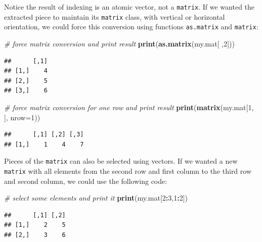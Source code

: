 \documentclass[11pt,]{book}
\newenvironment{Shaded}{\begin{snugshade}}{\end{snugshade}}
\newcommand{\KeywordTok}[1]{\textcolor[rgb]{0.27,0.27,0.27}{\textbf{#1}}}
\newcommand{\DataTypeTok}[1]{\textcolor[rgb]{0.27,0.27,0.27}{#1}}
\newcommand{\DecValTok}[1]{\textcolor[rgb]{0.06,0.06,0.06}{#1}}
\newcommand{\CommentTok}[1]{\textcolor[rgb]{0.56,0.35,0.01}{\textit{#1}}}
\newcommand{\OperatorTok}[1]{\textcolor[rgb]{0.81,0.36,0.00}{\textbf{#1}}}
\newcommand{\NormalTok}[1]{#1}
\begin{document}
Notice the result of indexing is an atomic vector, not a
\texttt{matrix}. If we wanted the extracted piece to maintain its
\texttt{matrix} class, with vertical or horizontal orientation, we could
force this conversion using functions \texttt{as.matrix} and
\texttt{matrix}:  

\begin{Shaded}
\begin{Highlighting}[]
\CommentTok{# force matrix conversion and print result}
\KeywordTok{print}\NormalTok{(}\KeywordTok{as.matrix}\NormalTok{(my.mat[ ,}\DecValTok{2}\NormalTok{]))}
\end{Highlighting}
\end{Shaded}

\begin{verbatim}
##      [,1]
## [1,]    4
## [2,]    5
## [3,]    6
\end{verbatim}

\begin{Shaded}
\begin{Highlighting}[]
\CommentTok{# force matrix conversion for one row and print result}
\KeywordTok{print}\NormalTok{(}\KeywordTok{matrix}\NormalTok{(my.mat[}\DecValTok{1}\NormalTok{, ], }\DataTypeTok{nrow=}\DecValTok{1}\NormalTok{))}
\end{Highlighting}
\end{Shaded}

\begin{verbatim}
##      [,1] [,2] [,3]
## [1,]    1    4    7
\end{verbatim}

Pieces of the \texttt{matrix} can also be selected using vectors. If we
wanted a new \texttt{matrix} with all elements from the second row and
first column to the third row and second column, we could use the
following code:

\begin{Shaded}
\begin{Highlighting}[]
\CommentTok{# select some elements and print it}
\KeywordTok{print}\NormalTok{(my.mat[}\DecValTok{2}\OperatorTok{:}\DecValTok{3}\NormalTok{,}\DecValTok{1}\OperatorTok{:}\DecValTok{2}\NormalTok{])}
\end{Highlighting}
\end{Shaded}

\begin{verbatim}
##      [,1] [,2]
## [1,]    2    5
## [2,]    3    6
\end{verbatim}
\end{document}
